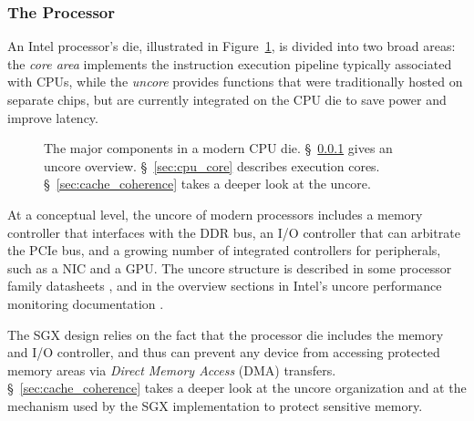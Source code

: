 \subsubsection{The Processor}
\label{sec:cpu_die}

An Intel processor's die, illustrated in Figure~\ref{fig:cpu_die}, is divided
into two broad areas: the \textit{core area} implements the instruction
execution pipeline typically associated with CPUs, while the \textit{uncore}
provides functions that were traditionally hosted on separate chips, but are
currently integrated on the CPU die to save power and improve latency.

\begin{figure}[hbt]
  \caption{
    The major components in a modern CPU die. \S~\ref{sec:cpu_die} gives
    an uncore overview. \S~\ref{sec:cpu_core} describes execution cores.
    \S~\ref{sec:cache_coherence} takes a deeper look at the uncore.
  }
  \label{fig:cpu_die}
\end{figure}


At a conceptual level, the uncore of modern processors includes a memory
controller that interfaces with the DDR bus, an I/O controller that can
arbitrate the PCIe bus, and a growing number of integrated controllers for
peripherals, such as a NIC and a GPU. The uncore structure is described in some
processor family datasheets \cite{intel2014datasheet, intel2010datasheet}, and
in the overview sections in Intel's uncore performance monitoring documentation
\cite{intel2014uncore, intel2012uncore, intel2010uncore}.

The SGX design relies on the fact that the processor die includes the memory
and I/O controller, and thus can prevent any device from accessing protected
memory areas via \textit{Direct Memory Access} (DMA) transfers.
\S~\ref{sec:cache_coherence} takes a deeper look at the uncore organization and
at the mechanism used by the SGX implementation to protect sensitive memory.


